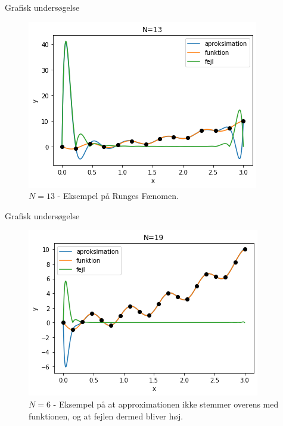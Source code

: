 
\begin{frame}{Grafisk undersøgelse}
    \begin{figure}[h!]
    \begin{center}
    \includegraphics[scale=0.5]{images/N=13.png}
    \end{center}
    \caption{$N = 13$ - Eksempel på Runges Fænomen.}
    \end{figure} 
\end{frame}

\begin{frame}{Grafisk undersøgelse}
    \begin{figure}[h!]
    \begin{center}
    \includegraphics[scale=0.5]{images/N=19.png}
    \end{center}
    \caption{$N = 6$ - Eksempel på at approximationen ikke stemmer overens med funktionen, og at fejlen dermed bliver høj.}
    \end{figure} 
    
\end{frame}


